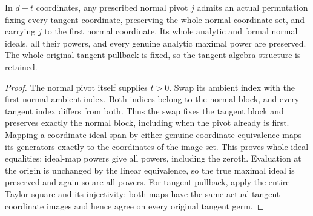 \begin{theorem}
\label{hir:actual-normal-reindex-pivot-powers}
\leanok
In $d+t$ coordinates, any prescribed normal pivot $j$ admits an actual
permutation fixing every tangent coordinate, preserving the whole normal
coordinate set, and carrying $j$ to the first normal coordinate. Its whole
analytic and formal normal ideals, all their powers, and every genuine
analytic maximal power are preserved. The whole original tangent pullback
is fixed, so the tangent algebra structure is retained.
\end{theorem}
\begin{proof}
The normal pivot itself supplies $t>0$. Swap its ambient index with the
first normal ambient index. Both indices belong to the normal block, and
every tangent index differs from both. Thus the swap fixes the tangent
block and preserves exactly the normal block, including when the pivot
already is first. Mapping a coordinate-ideal span by either genuine
coordinate equivalence maps its generators exactly to the coordinates of
the image set. This proves whole ideal equalities; ideal-map powers give
all powers, including the zeroth. Evaluation at the origin is unchanged
by the linear equivalence, so the true maximal ideal is preserved and
again so are all powers. For tangent pullback, apply the entire Taylor
square and its injectivity: both maps have the same actual tangent
coordinate images and hence agree on every original tangent germ.
\end{proof}

